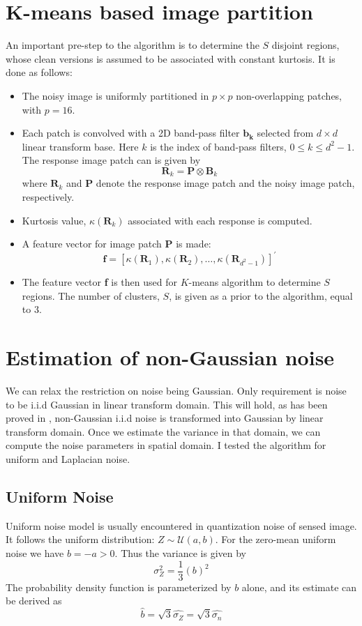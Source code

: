 \documentclass[11pt]{article}
\begin{document}
\section{K-means based image partition}
An important pre-step to the algorithm is to determine the $S$ disjoint regions, whose clean versions is assumed to be associated with constant kurtosis. It is done as follows:
\begin{itemize}
\item The noisy image is uniformly partitioned in $p\times p$ non-overlapping patches, with $p=16$. 
\item Each patch is convolved with a 2D band-pass filter $\mathbf{b_k}$ selected from $d\times d$ linear transform base. Here $k$ is the index of band-pass filters, $0 \leq k \leq d^2-1$. The response image patch can is given by 
$$\mathbf { R } _ { k } = \mathbf { P } \otimes \mathbf { B } _ { k }$$
where $\mathbf { R } _ { k }$ and  \textbf { P } denote the response image patch and the noisy image patch, respectively.
\item  Kurtosis value, $\kappa \left( \mathbf { R } _ { k } \right)$ associated with each response is computed.
\item A feature vector for image patch \textbf{P} is made:
$$\mathbf { f } = \left[ \kappa \left( \mathbf { R } _ { 1 } \right) , \kappa \left( \mathbf { R } _ { 2 } \right) , \ldots , \kappa \left( \mathbf { R } _ { d ^ { 2 } - 1 } \right) \right] ^ { \prime }$$
\item The feature vector \textbf{f} is then used for $K$-means algorithm to determine $S$ regions. The number of clusters, $S$, is given as a prior to the algorithm, equal to 3. 
\end{itemize}

\section{Estimation of non-Gaussian noise}
We can relax the restriction on noise being Gaussian. Only requirement is noise to be i.i.d Gaussian in linear transform domain. This will hold, as has been proved in \cite{feller}, non-Gaussian i.i.d noise is transformed into Gaussian by linear transform domain. Once we estimate the variance in that domain, we can compute the noise parameters in spatial domain. I tested the algorithm for uniform and Laplacian noise.

\subsection{Uniform Noise}
Uniform noise model is usually encountered in quantization noise of sensed image. It follows the uniform distribution: $Z \sim \mathcal{U}(a,b)$. For the zero-mean uniform noise we have $b = -a > 0$. Thus the variance is given by
$$\sigma_Z^2 = \frac{1}{3}\left(b\right)^2$$
The probability density function is parameterized by $b$ alone, and its estimate can be derived as
\begin{equation}
\hat{b} = \sqrt{3}\hat{\sigma_Z} = \sqrt{3}\hat{\sigma_n}
\end{equation}
\end{document}
